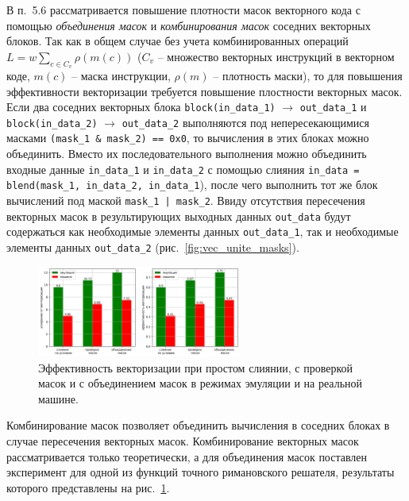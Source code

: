 \documentclass[a4paper,14pt]{extarticle}                     %
\theoremstyle{plain}                                         %
\begin{document}
В п.~5.6 рассматривается повышение плотности масок векторного кода с помощью \textit{объединения масок} и \textit{комбинирования масок} соседних векторных блоков.
Так как в общем случае без учета комбинированных операций $L = w \sum_{c \in C_v}{\rho(m(c))}$ ($C_v$ -- множество векторных инструкций в векторном коде, $m(c)$ -- маска инструкции, $\rho(m)$ -- плотность маски), то для повышения эффективности векторизации требуется повышение плостности векторных масок.
Если два соседних векторных блока \texttt{block(in\_data\_1)} $\rightarrow$ \texttt{out\_data\_1} и \texttt{block(in\_data\_2)} $\rightarrow$ \texttt{out\_data\_2} выполняются под непересекающимися масками \texttt{(mask\_1 \& mask\_2) == 0x0}, то вычисления в этих блоках можно объединить.
Вместо их последовательного выполнения можно объединить входные данные \texttt{in\_data\_1} и \texttt{in\_data\_2} с помощью слияния \texttt{in\_data = blend(mask\_1, in\_data\_2, in\_data\_1}), после чего выполнить тот же блок вычислений под маской \texttt{mask\_1 | mask\_2}.
Ввиду отсутствия пересечения векторных масок в результирующих выходных данных \texttt{out\_data} будут содержаться как необходимые элементы данных \texttt{out\_data\_1}, так и необходимые элементы данных \texttt{out\_data\_2} (рис.~\ref{fig:vec_unite_masks}).

\begin{figure}[!ht]
\centering
\includegraphics[width=0.6\textwidth]{./pics/text_4_vec_comb_mask/res.png}
\singlespacing
\caption{Эффективность векторизации при простом слиянии, с проверкой масок и с объединением масок в режимах эмуляции и на реальной машине.}
\label{fig:text_4_vec_comb_mask_res}
\end{figure}

Комбинирование масок позволяет объединить вычисления в соседних блоках в случае пересечения векторных масок.
Комбинирование векторных масок рассматривается только теоретически, а для объединения масок поставлен эксперимент для одной из функций точного римановского решателя, результаты которого представлены на рис.~\ref{fig:text_4_vec_comb_mask_res}.

\end{document}
